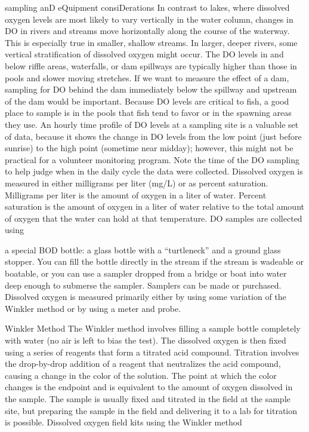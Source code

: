 \documentclass{article}
\begin{document}
sampling anD eQuipment consiDerations In contrast to lakes, where
dissolved oxygen levels are most likely to vary vertically in the water
column, changes in DO in rivers and streams move horizontally along the
course of the waterway. This is especially true in smaller, shallow
streams. In larger, deeper rivers, some vertical stratification of
dissolved oxygen might occur. The DO levels in and below riffle areas,
waterfalls, or dam spillways are typically higher than those in pools
and slower moving stretches. If we want to measure the effect of a dam,
sampling for DO behind the dam immediately below the spillway and
upstream of the dam would be important. Because DO levels are critical
to fish, a good place to sample is in the pools that fish tend to favor
or in the spawning areas they use. An hourly time profile of DO levels
at a sampling site is a valuable set of data, because it shows the
change in DO levels from the low point (just before sunrise) to the high
point (sometime near midday); however, this might not be practical for a
volunteer monitoring program. Note the time of the DO sampling to help
judge when in the daily cycle the data were collected. Dissolved oxygen
is measured in either milligrams per liter (mg/L) or as percent
saturation. Milligrams per liter is the amount of oxygen in a liter of
water. Percent saturation is the amount of oxygen in a liter of water
relative to the total amount of oxygen that the water can hold at that
temperature. DO samples are collected using

a special BOD bottle: a glass bottle with a ``turtleneck'' and a ground
glass stopper. You can fill the bottle directly in the stream if the
stream is wadeable or boatable, or you can use a sampler dropped from a
bridge or boat into water deep enough to submerse the sampler. Samplers
can be made or purchased. Dissolved oxygen is measured primarily either
by using some variation of the Winkler method or by using a meter and
probe.

Winkler Method The Winkler method involves filling a sample bottle
completely with water (no air is left to bias the test). The dissolved
oxygen is then fixed using a series of reagents that form a titrated
acid compound. Titration involves the drop-by-drop addition of a reagent
that neutralizes the acid compound, causing a change in the color of the
solution. The point at which the color changes is the endpoint and is
equivalent to the amount of oxygen dissolved in the sample. The sample
is usually fixed and titrated in the field at the sample site, but
preparing the sample in the field and delivering it to a lab for
titration is possible. Dissolved oxygen field kits using the Winkler
method
\end{document}
